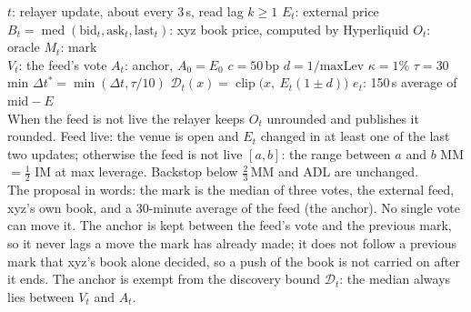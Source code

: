 \documentclass[10pt,a4paper,landscape]{extarticle}
\newcommand{\med}{\operatorname{med}}
\newcommand{\clip}{\operatorname{clip}}
\newcommand{\D}{\mathcal{D}}
\begin{document}
\vspace{2ex}
{\small
$t$: relayer update, about every 3\,s, read lag $k \ge 1$ \quad
$E_t$: external price \quad
$B_t = \med(\text{bid}_t, \text{ask}_t, \text{last}_t)$: xyz book price, computed by Hyperliquid \quad
$O_t$: oracle \quad $M_t$: mark\\
$V_t$: the feed's vote \quad $A_t$: anchor, $A_0 = E_0$ \quad
$c = 50$\,bp \quad $d = 1/\text{maxLev}$ \quad $\kappa = 1\%$ \quad $\tau = 30$\,min \quad $\Delta t^* = \min(\Delta t, \tau/10)$ \quad
$\D_t(x) = \clip\big(x,\ E_t(1\pm d)\big)$ \quad
$e_t$: 150\,s average of $\mathrm{mid} - E$\\
When the feed is not live the relayer keeps $O_t$ unrounded and publishes it rounded. Feed live: the venue is open and $E_t$ changed in at least one of the last two updates; otherwise the feed is not live \quad
$[a,b]$: the range between $a$ and $b$ \quad
MM $= \tfrac12$ IM at max leverage. \quad
Backstop below $\tfrac23$\,MM and ADL are unchanged.\\[0.8ex]
The proposal in words: the mark is the median of three votes, the external feed, xyz's own book, and a 30-minute average of the feed (the anchor). No single vote can move it. The anchor is kept between the feed's vote and the previous mark, so it never lags a move the mark has already made; it does not follow a previous mark that xyz's book alone decided, so a push of the book is not carried on after it ends. The anchor is exempt from the discovery bound $\D_t$: the median always lies between $V_t$ and $A_t$.}
\end{document}
